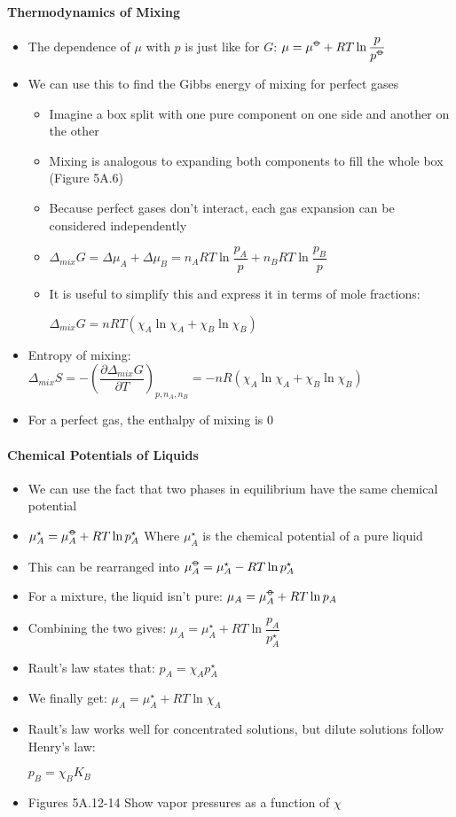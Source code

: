 \documentclass[12pt, openany, letterpaper]{memoir}
\begin{document}
\paragraph{Thermodynamics of Mixing}
\begin{itemize}
	\item The dependence of $\mu$ with $p$ is just like for $G$: $\mu=\mu^{\std}+RT\ln\dfrac{p}{p^{\std}}$
	\item We can use this to find the Gibbs energy of mixing for perfect gases
	      \begin{itemize}
		      \item Imagine a box split with one pure component on one side and another on the other
		      \item Mixing is analogous to expanding both components to fill the whole box (Figure 5A.6)
		      \item Because perfect gases don't interact, each gas expansion can be considered independently
		      \item $\Delta_{mix}G=\Delta \mu_A + \Delta \mu_B = n_A RT\ln\dfrac{p_A}{p} + n_B RT\ln\dfrac{p_B}{p}$
		      \item It is useful to simplify this and express it in terms of mole fractions:

		            $\Delta_{mix}G = nRT\left(\chi_A\ln\chi_A + \chi_B\ln\chi_B\right)$
	      \end{itemize}
	\item Entropy of mixing: $\Delta_{mix}S = -\left(\dfrac{\partial \Delta_{mix}G}{\partial T}\right)_{p,n_A,n_B} = -nR\left(\chi_A\ln\chi_A + \chi_B\ln\chi_B\right)$
	\item For a perfect gas, the enthalpy of mixing is $0$
\end{itemize}
\paragraph{Chemical Potentials of Liquids}
\begin{itemize}
	\item We can use the fact that two phases in equilibrium have the same chemical potential
	\item $\mu^\star_A = \mu^{\std}_A + RT\ln p^\star_A$ Where $\mu^\star_A$ is the chemical potential of a pure liquid
	\item This can be rearranged into $\mu_A^{\std} = \mu^\star_A-RT\ln p^\star_A$
	\item For a mixture, the liquid isn't pure: $\mu_A = \mu_A^{\std}+RT\ln p_A$
	\item Combining the two gives: $\mu_A = \mu_A^\star + RT\ln\dfrac{p_A}{p_A^\star}$
	\item Rault's law states that: $p_A = \chi_A p_A^{\star}$
	\item We finally get: $\mu_A = \mu_A^{\star} + RT\ln\chi_A$
	\item Rault's law works well for concentrated solutions, but dilute solutions follow Henry's law:

	      $p_B = \chi_B K_B$
	\item Figures 5A.12-14 Show vapor pressures as a function of $\chi$
\end{itemize}
\end{document}
